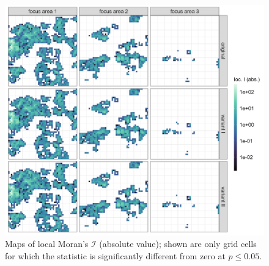 \begin{figure}[H]
    \centering
    \includegraphics[width = \linewidth]{figures/CaseStudy_CKM/r_locI_fa.png}
    \caption{Maps of local Moran's $\mathcal{I}$ (absolute value); shown are only grid cells for which the statistic is significantly different from zero at $p \leq 0.05$.}
    \label{fig:cs_locI}
\end{figure}

